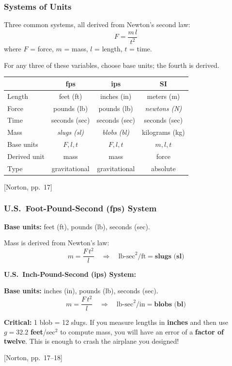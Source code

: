 \documentclass[10pt,aspectratio=43]{beamer}
\newcommand{\pref}[1]{\vfill\hfill{\scriptsize\color{gray}[Norton, pp.~#1]}}
\begin{document}

\begin{frame}
\frametitle{Systems of Units}

Three common systems, all derived from Newton's second law:
\[
  F = \frac{m \, l}{t^2}
\]
where $F$ = force, $m$ = mass, $l$ = length, $t$ = time.

\vspace{6pt}
For any three of these variables, choose base units; the fourth is derived.

\begin{center}
\small
\begin{tabular}{l|ccc}
\toprule
 & \textbf{fps} & \textbf{ips} & \textbf{SI} \\
\midrule
Length & feet (ft) & inches (in) & meters (m) \\
Force & pounds (lb) & pounds (lb) & \textit{newtons (N)} \\
Time & seconds (sec) & seconds (sec) & seconds (sec) \\
Mass & \textit{slugs (sl)} & \textit{blobs (bl)} & kilograms (kg) \\
\midrule
Base units & $F, l, t$ & $F, l, t$ & $m, l, t$ \\
Derived unit & mass & mass & force \\
Type & gravitational & gravitational & absolute \\
\bottomrule
\end{tabular}
\end{center}
\pref{17}
\end{frame}

\begin{frame}
\frametitle{U.S.\ Foot-Pound-Second (fps) System}

\textbf{Base units:} feet (ft), pounds (lb), seconds (sec).

Mass is derived from Newton's law:
\[
  m = \frac{F \, t^2}{l} \quad \Longrightarrow \quad \text{lb-sec}^2/\text{ft} = \textbf{slugs (sl)}
\]

\vspace{6pt}
\textbf{U.S.\ Inch-Pound-Second (ips) System:}

\textbf{Base units:} inches (in), pounds (lb), seconds (sec).
\[
  m = \frac{F \, t^2}{l} \quad \Longrightarrow \quad \text{lb-sec}^2/\text{in} = \textbf{blobs (bl)}
\]

\begin{redbox}
\textbf{Critical:} 1 blob = 12 slugs. If you measure lengths in \textbf{inches} and then use $g = 32.2$ \textbf{feet}/sec$^2$ to compute mass, you will have an error of a \textbf{factor of twelve}. This is enough to crash the airplane you designed!
\end{redbox}
\pref{17--18}
\end{frame}
\end{document}

